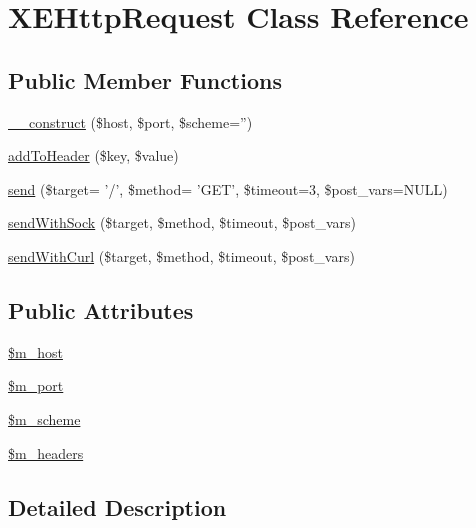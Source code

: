 \hypertarget{classXEHttpRequest}{\section{X\-E\-Http\-Request Class Reference}
\label{classXEHttpRequest}
}
\subsection*{Public Member Functions}
\begin{DoxyCompactItemize}
\item 
\hyperlink{classXEHttpRequest_aa45b86d9e0ac7298d14c7013691c54f9}{\-\_\-\-\_\-construct} (\$host, \$port, \$scheme='')
\item 
\hyperlink{classXEHttpRequest_af936bdc66e6dcabbd8934afc5e210063}{add\-To\-Header} (\$key, \$value)
\item 
\hyperlink{classXEHttpRequest_a8f75aef64b09a7b2d007bdce562eaaf6}{send} (\$target= '/', \$method= 'G\-E\-T', \$timeout=3, \$post\-\_\-vars=N\-U\-L\-L)
\item 
\hyperlink{classXEHttpRequest_a9e316ec4c68dfe9a124327287dae2754}{send\-With\-Sock} (\$target, \$method, \$timeout, \$post\-\_\-vars)
\item 
\hyperlink{classXEHttpRequest_ae6412b6f079b88a67f43602d3cdae2d7}{send\-With\-Curl} (\$target, \$method, \$timeout, \$post\-\_\-vars)
\end{DoxyCompactItemize}
\subsection*{Public Attributes}
\begin{DoxyCompactItemize}
\item 
\hyperlink{classXEHttpRequest_ad88148dced2b42017a96b2a5dd0b533a}{\$m\-\_\-host}
\item 
\hyperlink{classXEHttpRequest_a35c62f61b5ad2c200c53a58dd43a2784}{\$m\-\_\-port}
\item 
\hyperlink{classXEHttpRequest_a501919f00934ef2cc76300fa32c2f19d}{\$m\-\_\-scheme}
\item 
\hyperlink{classXEHttpRequest_a36df236b46af2f09dd9020096dbaed22}{\$m\-\_\-headers}
\end{DoxyCompactItemize}


\subsection{Detailed Description}


